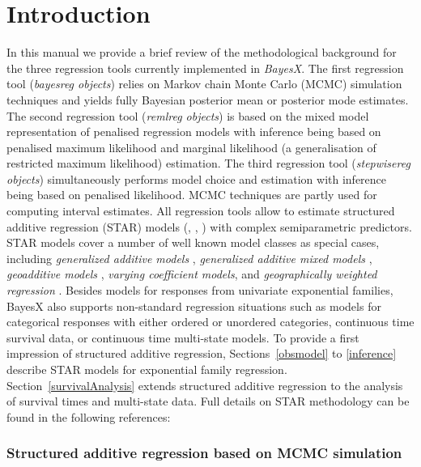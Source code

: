 \documentclass[11pt,a4paper,twoside]{bayesxarticle}
\begin{document}
\MakeShortVerb{\#}


\newpage

\section{Introduction}

In this manual we provide a brief review of the methodological background for the three regression tools currently implemented
in {\em BayesX}. The first regression tool ({\em bayesreg objects}) relies on Markov chain Monte Carlo (MCMC) simulation
techniques and yields fully Bayesian posterior mean or posterior mode estimates. The second regression tool ({\em remlreg
objects}) is based on the mixed model representation of penalised regression models with inference being based on penalised
maximum likelihood and marginal likelihood (a generalisation of restricted maximum likelihood) estimation. The third regression
tool ({\em stepwisereg objects}) simultaneously performs model choice and estimation with inference being based on penalised
likelihood. MCMC techniques are partly used for computing interval estimates. All regression tools allow to estimate structured
additive regression (STAR) models (, , ) with complex semiparametric predictors.
STAR models cover a number of well
known model classes as special cases, including {\em generalized additive models} \cite{HasTib90}, {\em generalized additive
mixed models} \cite{LinZha99}, {\em geoadditive models} \cite{KamWan03}, {\em varying coefficient models}\cite{HasTib93}, and
{\em geographically weighted regression} . Besides models for responses from univariate exponential
families, BayesX also supports non-standard regression situations such as models for categorical responses with either ordered
or unordered categories, continuous time survival data, or continuous time multi-state models. To provide a first impression of
structured additive regression, Sections~\ref{obsmodel} to \ref{inference} describe STAR models for exponential family
regression. Section~\ref{survivalAnalysis} extends structured additive regression to the analysis of survival times and
multi-state data. Full details on STAR methodology can be found in the following references:

\subsubsection*{Structured additive regression based on MCMC
simulation}
\end{document}
